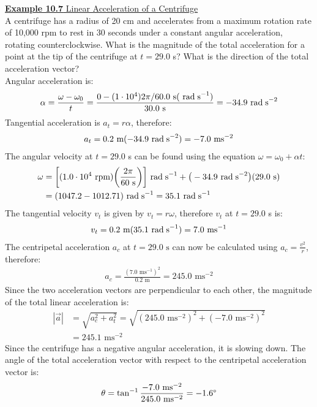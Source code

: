 \documentclass[a4paper]{article}
\let\bf\textbf
\newcommand\rads{\text{ rad\;s}^{-1}}
\newcommand\radss{\text{ rad\;s}^{-2}}
\newcommand\s{\text{ s}}
\newcommand\m{\text{ m}}
\newcommand\ms{\text{ ms}^{-1}}
\newcommand\mss{\text{ ms}^{-2}}
\begin{document}
\newpage
\begin{shaded}
    \underline{\bf{Example 10.7} Linear Acceleration of a Centrifuge}
    \vspace{2mm}\\
    A centrifuge has a radius of 20 cm and accelerates from a maximum rotation rate of 10,000 rpm to rest in 30 seconds under a constant angular acceleration, rotating counterclockwise. What is the magnitude of the total acceleration for a point at the tip  of the centrifuge at $t = 29.0$ s? What is the direction of the total acceleration vector?
    \vspace{1mm}\\
    Angular acceleration is:
    \begin{align*}
        \alpha = \frac{\omega - \omega_0}{t} = \frac{0 - (1 \cdot 10^4)2\pi/60.0\s(\rads)}{30.0\s} = -34.9\radss
    \end{align*}
    Tangential acceleration is $a_t = r\alpha$, therefore:
    \begin{align*}
        a_t = 0.2\text{ m}(-34.9\radss) = -7.0\mss
    \end{align*}
    The angular velocity at $t = 29.0$ s can be found using the equation $\omega = \omega_0 + \alpha t$:
    \begin{align*}
        \omega &= \bigg[(1.0 \cdot 10^4\text{ rpm})\bigg(\frac{2\pi}{60\s}\bigg)\bigg]\rads + \big(-34.9\radss\big)(29.0\s)\\
        &= (1047.2 - 1012.71)\rads = 35.1\rads
    \end{align*}
    The tangential velocity $v_t$ is given by $v_t = r\omega$, therefore $v_t$ at $t = 29.0$ s is:
    \begin{align*}
        v_t = 0.2\m(35.1\rads) = 7.0\ms
    \end{align*}
    The centripetal acceleration $a_c$ at $t = 29.0\s$ can now be calculated using $a_c = \frac{v^2}{r}$, therefore:
    \begin{align*}
        a_c = \frac{(7.0\ms)^2}{0.2\m} = 245.0 \mss
    \end{align*}
    Since the two acceleration vectors are perpendicular to each other, the magnitude of the total linear acceleration is:
    \begin{align*}
        |\vec{a}| &= \sqrt{a_c^2 + a_t^2} = \sqrt{(245.0\mss)^2 + (-7.0\mss)^2}\\
        &= 245.1\mss
    \end{align*}
    Since the centrifuge has a negative angular acceleration, it is slowing down. The angle of the total acceleration vector with respect to the centripetal acceleration vector is:
    \begin{align*}
        \theta = \tan^{-1}\frac{-7.0\mss}{245.0\mss} = -1.6\degree
    \end{align*}
\end{shaded}
\newpage
\end{document}
